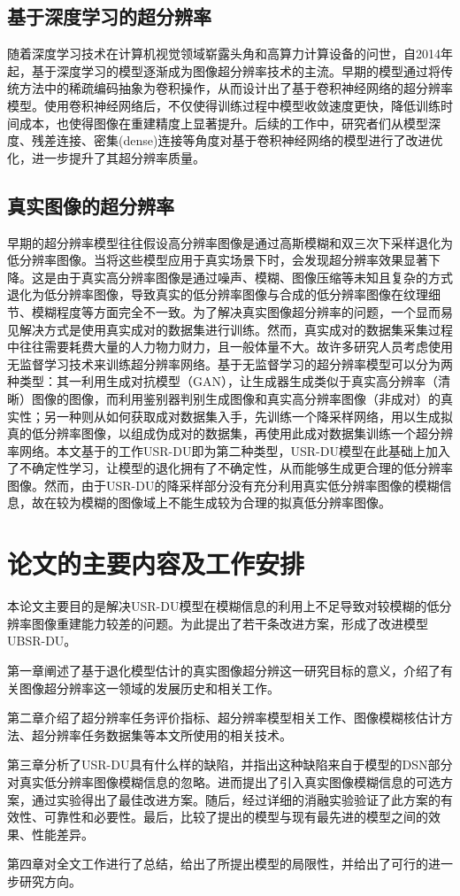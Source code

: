 \subsection{基于深度学习的超分辨率}
随着深度学习技术在计算机视觉领域崭露头角和高算力计算设备的问世，自2014年起，基于深度学习的模型逐渐成为图像超分辨率技术的主流。早期的模型\parencite{SRCNN}通过将传统方法中的稀疏编码抽象为卷积操作，从而设计出了基于卷积神经网络的超分辨率模型。使用卷积神经网络后，不仅使得训练过程中模型收敛速度更快，降低训练时间成本，也使得图像在重建精度上显著提升。后续的工作中，研究者们从模型深度、残差连接、密集(dense)连接等角度对基于卷积神经网络的模型进行了改进优化，进一步提升了其超分辨率质量。

\subsection{真实图像的超分辨率}
早期的超分辨率模型往往假设高分辨率图像是通过高斯模糊和双三次下采样退化为低分辨率图像。当将这些模型应用于真实场景下时，会发现超分辨率效果显著下降。这是由于真实高分辨率图像是通过噪声、模糊、图像压缩等未知且复杂的方式退化为低分辨率图像，导致真实的低分辨率图像与合成的低分辨率图像在纹理细节、模糊程度等方面完全不一致。为了解决真实图像超分辨率的问题，一个显而易见解决方式是使用真实成对的数据集进行训练。然而，真实成对的数据集采集过程中往往需要耗费大量的人力物力财力，且一般体量不大。故许多研究人员考虑使用无监督学习技术来训练超分辨率网络。基于无监督学习的超分辨率模型可以分为两种类型：其一利用生成对抗模型\parencite{goodfellow2020generative}（GAN），让生成器生成类似于真实高分辨率（清晰）图像的图像，而利用鉴别器判别生成图像和真实高分辨率图像（非成对）的真实性；另一种则从如何获取成对数据集入手，先训练一个降采样网络，用以生成拟真的低分辨率图像，以组成伪成对的数据集，再使用此成对数据集训练一个超分辨率网络。本文基于的工作USR-DU\parencite{ijcai2022p176}即为第二种类型，USR-DU模型在此基础上加入了不确定性学习，让模型的退化拥有了不确定性，从而能够生成更合理的低分辨率图像。然而，由于USR-DU的降采样部分没有充分利用真实低分辨率图像的模糊信息，故在较为模糊的图像域上不能生成较为合理的拟真低分辨率图像。

\section{论文的主要内容及工作安排}
本论文主要目的是解决USR-DU模型在模糊信息的利用上不足导致对较模糊的低分辨率图像重建能力较差的问题。为此提出了若干条改进方案，形成了改进模型UBSR-DU。

第一章阐述了基于退化模型估计的真实图像超分辨这一研究目标的意义，介绍了有关图像超分辨率这一领域的发展历史和相关工作。

第二章介绍了超分辨率任务评价指标、超分辨率模型相关工作、图像模糊核估计方法、超分辨率任务数据集等本文所使用的相关技术。

第三章分析了USR-DU具有什么样的缺陷，并指出这种缺陷来自于模型的DSN部分对真实低分辨率图像模糊信息的忽略。进而提出了引入真实图像模糊信息的可选方案，通过实验得出了最佳改进方案。随后，经过详细的消融实验验证了此方案的有效性、可靠性和必要性。最后，比较了提出的模型与现有最先进的模型之间的效果、性能差异。

第四章对全文工作进行了总结，给出了所提出模型的局限性，并给出了可行的进一步研究方向。